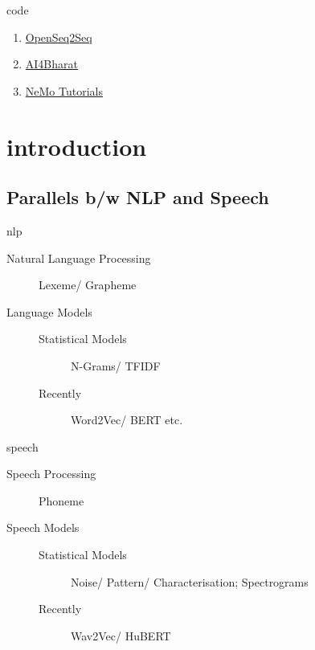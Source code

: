\documentclass[aspectratio=169,xcolor={dvipsnames,svgnames}]{beamer}
\begin{document}
\begin{frame}[label={sec:orgb4fd9a0}]{code}
\begin{enumerate}
\item \href{https://github.com/NVIDIA/OpenSeq2Seq}{OpenSeq2Seq}
\item \href{https://github.com/AI4Bharat/Indic-TTS}{AI4Bharat}
\item \href{https://github.com/NVIDIA/NeMo/tree/stable/tutorials/}{NeMo Tutorials}
\end{enumerate}
\end{frame}

\section{introduction}
\label{schedule-introduction}
\subsection{Parallels b/w NLP and Speech}
\label{sec:orgd34f472}
\begin{frame}[label={sec:org0cea720}]{nlp}
\begin{description}
\item[{Natural Language Processing}] Lexeme/ Grapheme
\item[{Language Models}] \begin{description}
\item[{Statistical Models}] N-Grams/ TFIDF
\item[{Recently}] Word2Vec/ BERT etc.
\end{description}
\end{description}
\end{frame}
\begin{frame}[label={sec:orgb747c35}]{speech}
\begin{description}
\item[{Speech Processing}] Phoneme
\item[{Speech Models}] \begin{description}
\item[{Statistical Models}] Noise/ Pattern/
Characterisation; Spectrograms
\item[{Recently}] Wav2Vec/ HuBERT
\end{description}
\end{description}
\end{frame}
\end{document}
